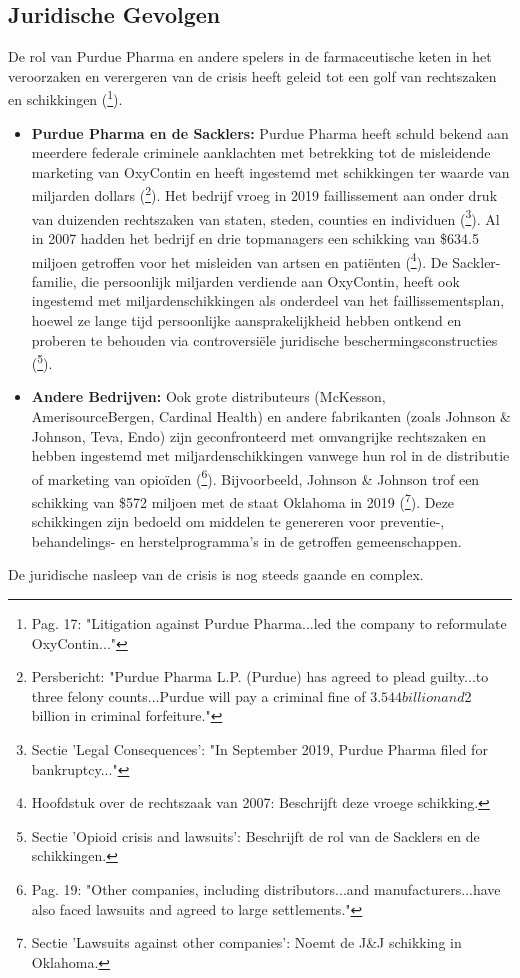 \documentclass[11pt, a4paper]{report} %
\begin{document}
\subsection{Juridische Gevolgen}
De rol van Purdue Pharma en andere spelers in de farmaceutische keten in het veroorzaken en verergeren van de crisis heeft geleid tot een golf van rechtszaken en schikkingen (\cite{Maclean2020EconomicStudiesOpioid}\footnote{Pag. 17: "Litigation against Purdue Pharma...led the company to reformulate OxyContin..."}).
\begin{itemize}
    \item \textbf{Purdue Pharma en de Sacklers:} Purdue Pharma heeft schuld bekend aan meerdere federale criminele aanklachten met betrekking tot de misleidende marketing van OxyContin en heeft ingestemd met schikkingen ter waarde van miljarden dollars (\cite{JusticeDeptPurdueResolution}\footnote{Persbericht: "Purdue Pharma L.P. (Purdue) has agreed to plead guilty...to three felony counts...Purdue will pay a criminal fine of $3.544 billion and $2 billion in criminal forfeiture."}). Het bedrijf vroeg in 2019 faillissement aan onder druk van duizenden rechtszaken van staten, steden, counties en individuen (\cite{HealthlineDopesickTruth}\footnote{Sectie 'Legal Consequences': "In September 2019, Purdue Pharma filed for bankruptcy..."}). Al in 2007 hadden het bedrijf en drie topmanagers een schikking van \$634.5 miljoen getroffen voor het misleiden van artsen en patiënten (\cite{Macy2018Dopesick}\footnote{Hoofdstuk over de rechtszaak van 2007: Beschrijft deze vroege schikking.}). De Sackler-familie, die persoonlijk miljarden verdiende aan OxyContin, heeft ook ingestemd met miljardenschikkingen als onderdeel van het faillissementsplan, hoewel ze lange tijd persoonlijke aansprakelijkheid hebben ontkend en proberen te behouden via controversiële juridische beschermingsconstructies (\cite{WikipediaRichardSackler}\footnote{Sectie 'Opioid crisis and lawsuits': Beschrijft de rol van de Sacklers en de schikkingen.}).
    \item \textbf{Andere Bedrijven:} Ook grote distributeurs (McKesson, AmerisourceBergen, Cardinal Health) en andere fabrikanten (zoals Johnson \& Johnson, Teva, Endo) zijn geconfronteerd met omvangrijke rechtszaken en hebben ingestemd met miljardenschikkingen vanwege hun rol in de distributie of marketing van opioïden (\cite{Maclean2020EconomicStudiesOpioid}\footnote{Pag. 19: "Other companies, including distributors...and manufacturers...have also faced lawsuits and agreed to large settlements."}). Bijvoorbeeld, Johnson \& Johnson trof een schikking van \$572 miljoen met de staat Oklahoma in 2019 (\cite{WikipediaOpioidEpidemicUS}\footnote{Sectie 'Lawsuits against other companies': Noemt de J&J schikking in Oklahoma.}). Deze schikkingen zijn bedoeld om middelen te genereren voor preventie-, behandelings- en herstelprogramma's in de getroffen gemeenschappen.
\end{itemize}
De juridische nasleep van de crisis is nog steeds gaande en complex.
\end{document}
